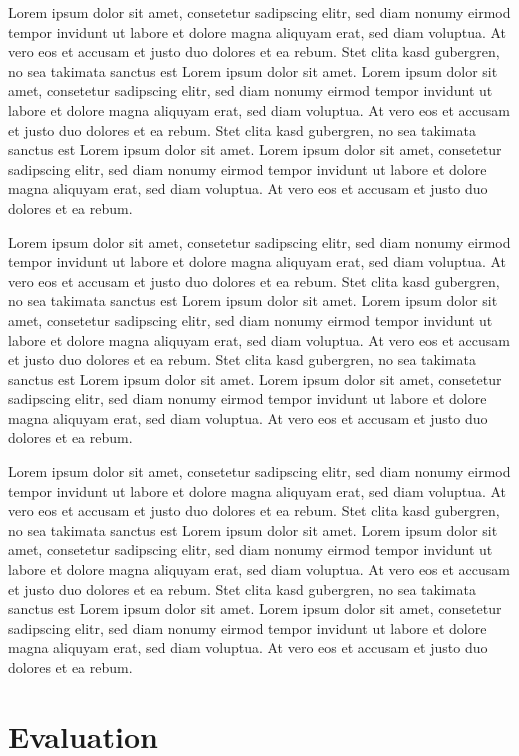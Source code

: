 \documentclass[preprint,journal]{vgtc}       %
\begin{document}
Lorem ipsum dolor sit amet, consetetur sadipscing elitr, sed diam
nonumy eirmod tempor invidunt ut labore et dolore magna aliquyam erat,
sed diam voluptua. At vero eos et accusam et justo duo dolores et ea
rebum. Stet clita kasd gubergren, no sea takimata sanctus est Lorem
ipsum dolor sit amet. Lorem ipsum dolor sit amet, consetetur
sadipscing elitr, sed diam nonumy eirmod tempor invidunt ut labore et
dolore magna aliquyam erat, sed diam voluptua. At vero eos et accusam
et justo duo dolores et ea rebum. Stet clita kasd gubergren, no sea
takimata sanctus est Lorem ipsum dolor sit amet. Lorem ipsum dolor sit
amet, consetetur sadipscing elitr, sed diam nonumy eirmod tempor
invidunt ut labore et dolore magna aliquyam erat, sed diam
voluptua. At vero eos et accusam et justo duo dolores et ea
rebum.

Lorem ipsum dolor sit amet, consetetur sadipscing elitr, sed diam
nonumy eirmod tempor invidunt ut labore et dolore magna aliquyam erat,
sed diam voluptua. At vero eos et accusam et justo duo dolores et ea
rebum. Stet clita kasd gubergren, no sea takimata sanctus est Lorem
ipsum dolor sit amet. Lorem ipsum dolor sit amet, consetetur
sadipscing elitr, sed diam nonumy eirmod tempor invidunt ut labore et
dolore magna aliquyam erat, sed diam voluptua. At vero eos et accusam
et justo duo dolores et ea rebum. Stet clita kasd gubergren, no sea
takimata sanctus est Lorem ipsum dolor sit amet. Lorem ipsum dolor sit
amet, consetetur sadipscing elitr, sed diam nonumy eirmod tempor
invidunt ut labore et dolore magna aliquyam erat, sed diam
voluptua. At vero eos et accusam et justo duo dolores et ea
rebum.

Lorem ipsum dolor sit amet, consetetur sadipscing elitr, sed diam
nonumy eirmod tempor invidunt ut labore et dolore magna aliquyam erat,
sed diam voluptua. At vero eos et accusam et justo duo dolores et ea
rebum. Stet clita kasd gubergren, no sea takimata sanctus est Lorem
ipsum dolor sit amet. Lorem ipsum dolor sit amet, consetetur
sadipscing elitr, sed diam nonumy eirmod tempor invidunt ut labore et
dolore magna aliquyam erat, sed diam voluptua. At vero eos et accusam
et justo duo dolores et ea rebum. Stet clita kasd gubergren, no sea
takimata sanctus est Lorem ipsum dolor sit amet. Lorem ipsum dolor sit
amet, consetetur sadipscing elitr, sed diam nonumy eirmod tempor
invidunt ut labore et dolore magna aliquyam erat, sed diam
voluptua. At vero eos et accusam et justo duo dolores et ea
rebum.

\newpage

\section{Evaluation}
\end{document}
